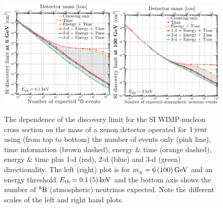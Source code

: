 \begin{figure}
\begin{center}
\includegraphics[trim = 0mm 0mm 0mm 0mm, clip,width=0.49\textwidth,angle=0]{Figures/SI_discovery_Xe_6GeV.eps}
\includegraphics[trim = 0mm 0mm 0mm 0mm, clip,width=0.49\textwidth,angle=0]{Figures/SI_discovery_Xe_100GeV.eps}
\caption[Neutrino floor vs detector mass for different readout strategies]{The dependence of the discovery limit for the SI WIMP-nucleon cross section on the mass of a xenon detector operated for $1 \, {\rm year}$ using  (from top to bottom) 
the number of events only (pink line), time information (brown dashed),  energy \& time (orange dashed), energy \& time  plus 1-d (red), 2-d (blue) and 3-d (green) directionality. 
The left (right) plot is for $m_{\chi} = 6 \, (100) \, {\rm GeV} $ and an energy threshold $E_{\rm th} = 0.1 \, (5) \, {\rm keV}$ and the bottom axis shows the number of ${}^{8}\rm{B}$  (atmospheric) neutrinos expected. 
Note the different scales of the left and right hand plots.} 
\label{fig:detectormass}
\end{center}
\end{figure}

